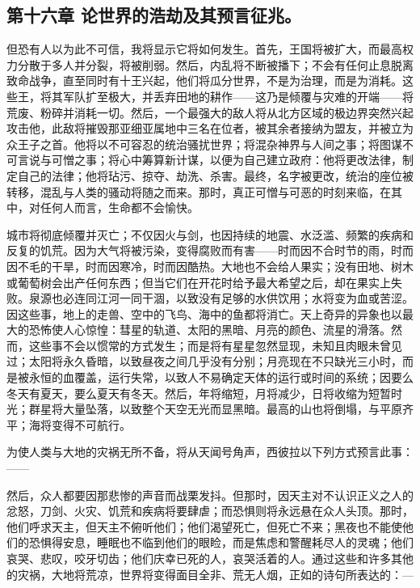 
\subsection{第十六章 论世界的浩劫及其预言征兆。}

但恐有人以为此不可信，我将显示它将如何发生。首先，王国将被扩大，而最高权力分散于多人并分裂，将被削弱。然后，内乱将不断被播下；不会有任何止息脱离致命战争，直至同时有十王兴起，他们将瓜分世界，不是为治理，而是为消耗。这些王，将其军队扩至极大，并丢弃田地的耕作——这乃是倾覆与灾难的开端——将荒废、粉碎并消耗一切。然后，一个最强大的敌人将从北方区域的极边界突然兴起攻击他，此敌将摧毁那亚细亚属地中三名在位者，被其余者接纳为盟友，并被立为众王子之首。他将以不可容忍的统治骚扰世界；将混杂神界与人间之事；将图谋不可言说与可憎之事；将心中筹算新计谋，以便为自己建立政府：他将更改法律，制定自己的法律；他将玷污、掠夺、劫洗、杀害。最终，名字被更改，统治的座位被转移，混乱与人类的骚动将随之而来。那时，真正可憎与可恶的时刻来临，在其中，对任何人而言，生命都不会愉快。\par

城市将彻底倾覆并灭亡；不仅因火与剑，也因持续的地震、水泛滥、频繁的疾病和反复的饥荒。因为大气将被污染，变得腐败而有害——时而因不合时节的雨，时而因不毛的干旱，时而因寒冷，时而因酷热。大地也不会给人果实；没有田地、树木或葡萄树会出产任何东西；但当它们在开花时给予最大希望之后，却在果实上失败。泉源也必连同江河一同干涸，以致没有足够的水供饮用；水将变为血或苦涩。因这些事，地上的走兽、空中的飞鸟、海中的鱼都将消亡。天上奇异的异象也以最大的恐怖使人心惊惶：彗星的轨道、太阳的黑暗、月亮的颜色、流星的滑落。然而，这些事不会以惯常的方式发生；而是将有星星忽然显现，未知且肉眼未曾见过；太阳将永久昏暗，以致昼夜之间几乎没有分别；月亮现在不只缺光三小时，而是被永恒的血覆盖，运行失常，以致人不易确定天体的运行或时间的系统；因要么冬天有夏天，要么夏天有冬天。然后，年将缩短，月将减少，日将收缩为短暂时光；群星将大量坠落，以致整个天空无光而显黑暗。最高的山也将倒塌，与平原齐平；海将变得不可航行。\par

为使人类与大地的灾祸无所不备，将从天闻号角声，西彼拉以下列方式预言此事：——\par

\par

然后，众人都要因那悲惨的声音而战栗发抖。但那时，因天主对不认识正义之人的忿怒，刀剑、火灾、饥荒和疾病将要肆虐；而恐惧则将永远悬在众人头顶。那时，他们呼求天主，但天主不俯听他们；他们渴望死亡，但死亡不来；黑夜也不能使他们的恐惧得安息，睡眠也不临到他们的眼睑，而是焦虑和警醒耗尽人的灵魂；他们哀哭、悲叹，咬牙切齿；他们庆幸已死的人，哀哭活着的人。通过这些和许多其他的灾祸，大地将荒凉，世界将变得面目全非、荒无人烟，正如的诗句所表达的：—\par

